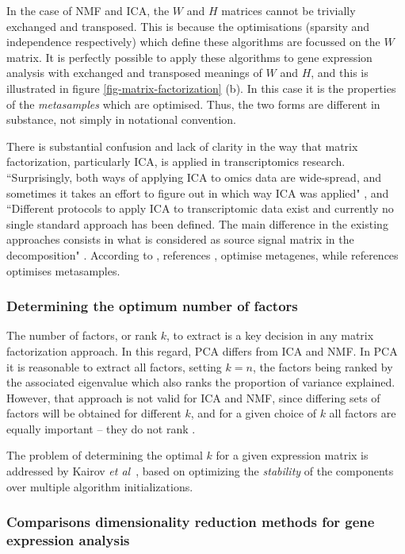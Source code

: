 \documentclass[tikz, 12pt,a4paper,oneside,fleqn]{article}
\newcommand{\etal}{{\em et al\/}}
\begin{document}
In the case of NMF and ICA, the $W$ and $H$ matrices cannot be trivially exchanged and transposed.  This is because the optimisations (sparsity and independence respectively) which define these algorithms are focussed on the $W$ matrix.  It is perfectly possible to apply these algorithms to gene expression analysis with exchanged and transposed meanings of $W$ and $H$, and this is illustrated in figure \ref{fig-matrix-factorization} (b).  In this case it is the properties of the \emph{metasamples} which are optimised.  Thus, the two forms are different in substance, not simply in notational convention.

There is substantial confusion and lack of clarity in the way that matrix factorization, particularly ICA, is applied in transcriptomics research.  
``Surprisingly, both ways of applying ICA to omics data are wide-spread, and sometimes it takes an effort to figure out in which way ICA was applied" \cite{Sompairac2019}, and ``Different protocols to apply ICA to transcriptomic data exist and currently no single standard approach has been defined. The main difference in the existing approaches consists in what is considered as source signal matrix in the decomposition" \cite{Cantini2019}.  
According to \cite{Cantini2019}, references \cite{Au-Yeung2014,Kairov2017,Kong2008,Lee2003},  optimise metagenes, while references \cite{Meng2016,Barillot2013} optimises metasamples.


\subsubsection{Determining the optimum number of factors}

The number of factors, or rank $k$, to extract is a key decision in any matrix factorization approach.  In this regard, PCA differs from ICA and NMF.  In PCA it is reasonable to extract all factors, setting $k=n$, the factors being ranked by the associated eigenvalue which also ranks the proportion of variance explained.   However, that approach is not valid for ICA and NMF, since differing sets of factors will be obtained for different $k$, and for a given choice of $k$ all factors are equally important -- they do not rank \cite{Stein-OBrien2018}.

The problem of determining the optimal $k$ for a given expression matrix is addressed  by Kairov \etal\ \cite{Kairov2017}, based on optimizing the \emph{stability} of the components over multiple algorithm initializations.

\subsubsection{Comparisons dimensionality reduction methods for gene expression analysis}
\label{sec-comparative-dimensionality-studies}
\end{document}
